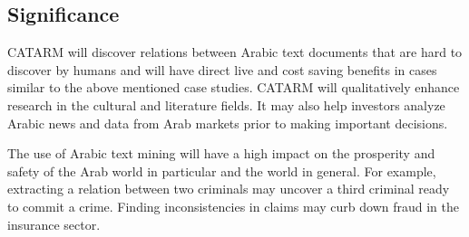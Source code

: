 \documentclass[12pt]{article}
\begin{document}
 
\subsection{Significance} 

CATARM will discover relations between Arabic text documents that 
are hard to discover by humans and will have direct live and
cost saving benefits in cases similar to the above mentioned 
case studies. 
CATARM will qualitatively enhance research in the cultural and 
literature fields. 
It may also help investors analyze Arabic news and data from Arab 
markets prior to making important decisions.

The use of Arabic text mining  will 
have a high impact on the prosperity and safety of the Arab world 
in particular and the world in general.
For example, extracting a relation between two criminals may 
uncover a third criminal ready to commit a crime.
Finding inconsistencies in claims may curb down fraud 
in the insurance sector.
\end{document}
